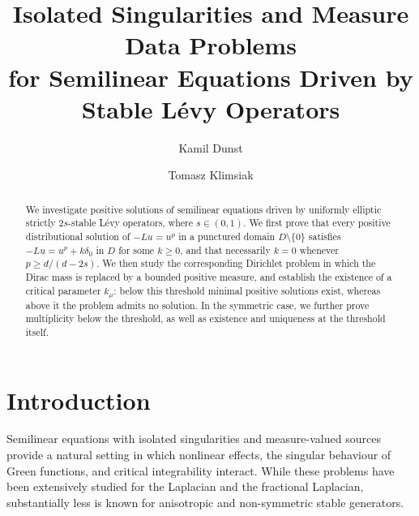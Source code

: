 \documentclass[11pt,a4paper,reqno]{amsart}
\theoremstyle{definition}
\numberwithin{equation}{section}
\begin{document}
\title[Semilinear equations for stable L\'evy operators]
{Isolated Singularities and Measure Data Problems\\
for Semilinear Equations Driven by Stable L\'evy Operators}

\author[K. Dunst]{Kamil Dunst}
\author[T. Klimsiak]{Tomasz Klimsiak}

\address{
Faculty of Mathematics and Computer Science,
Nicolaus Copernicus University in Toru\'n,
Chopina 12/18,
87-100 Toru\'n,
Poland
}




\begin{abstract}
We investigate positive solutions of semilinear equations driven by uniformly elliptic strictly $2s$-stable 
L\'evy  operators, where $s\in (0,1)$.
We first prove that every positive distributional solution of $-Lu=u^p$ in a punctured domain $D\setminus\{0\}$ satisfies
 $-Lu=u^p+k\delta_0$ in $D$ for some $k\ge0$, and that necessarily $k=0$ whenever $p\ge d/(d-2s)$. 
We then study the corresponding Dirichlet problem in which the Dirac mass is replaced by a bounded positive measure, 
and establish the existence of a critical parameter $k_\mu$: below this threshold minimal positive solutions exist, whereas above it the problem admits no solution. 
In the symmetric case, we further prove multiplicity below the threshold, as well as existence and uniqueness at the threshold itself.
\end{abstract}

\maketitle

\section{Introduction}
\label{sec1}


Semilinear equations with isolated singularities and measure-valued
sources provide a natural setting in which nonlinear effects, the
singular behaviour of Green functions, and critical integrability
interact. While these problems have been extensively studied for the
Laplacian and the fractional Laplacian, substantially less is known for
anisotropic and non-symmetric stable generators.
\end{document}
